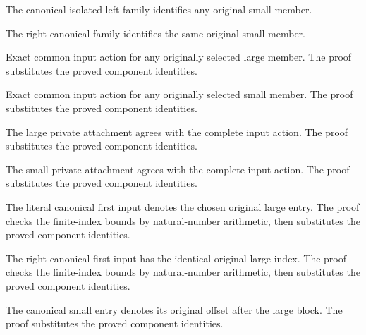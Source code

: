 The canonical isolated left family identifies any original small member.
\par{}

The right canonical family identifies the same original small member.
\par{}

Exact common input action for any originally selected large member.
The proof substitutes the proved component identities.
\par{}

Exact common input action for any originally selected small member.
The proof substitutes the proved component identities.
\par{}

The large private attachment agrees with the complete input action.
The proof substitutes the proved component identities.
\par{}

The small private attachment agrees with the complete input action.
The proof substitutes the proved component identities.
\par{}

The literal canonical first input denotes the chosen original large entry.
The proof checks the finite-index bounds by natural-number arithmetic, then substitutes the proved component identities.
\par{}

The right canonical first input has the identical original large index.
The proof checks the finite-index bounds by natural-number arithmetic, then substitutes the proved component identities.
\par{}

The canonical small entry denotes its original offset after the large block.
The proof substitutes the proved component identities.
\par{}

